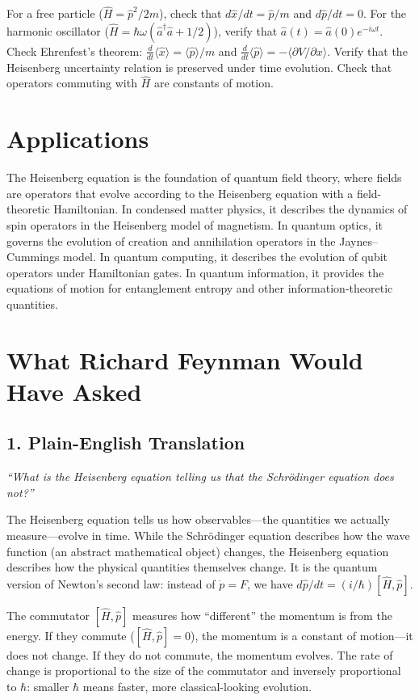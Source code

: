 \documentclass[11pt,openright]{book}
\begin{document}
For a free particle ($\hat{H} = \hat{p}^2/2m$), check that $d\hat{x}/dt = \hat{p}/m$ and $d\hat{p}/dt = 0$. For the harmonic oscillator ($\hat{H} = \hbar\omega(\hat{a}^\dagger\hat{a} + 1/2)$), verify that $\hat{a}(t) = \hat{a}(0)e^{-i\omega t}$. Check Ehrenfest's theorem: $\frac{d}{dt}\langle\hat{x}\rangle = \langle\hat{p}\rangle/m$ and $\frac{d}{dt}\langle\hat{p}\rangle = -\langle\partial V/\partial x\rangle$. Verify that the Heisenberg uncertainty relation is preserved under time evolution. Check that operators commuting with $\hat{H}$ are constants of motion.
\section*{Applications}

The Heisenberg equation is the foundation of quantum field theory, where fields are operators that evolve according to the Heisenberg equation with a field-theoretic Hamiltonian. In condensed matter physics, it describes the dynamics of spin operators in the Heisenberg model of magnetism. In quantum optics, it governs the evolution of creation and annihilation operators in the Jaynes--Cummings model. In quantum computing, it describes the evolution of qubit operators under Hamiltonian gates. In quantum information, it provides the equations of motion for entanglement entropy and other information-theoretic quantities.
\section*{What Richard Feynman Would Have Asked}

\subsection*{1. Plain-English Translation}
\textit{``What is the Heisenberg equation telling us that the Schr\"odinger equation does not?''}

The Heisenberg equation tells us how observables---the quantities we actually measure---evolve in time. While the Schr\"odinger equation describes how the wave function (an abstract mathematical object) changes, the Heisenberg equation describes how the physical quantities themselves change. It is the quantum version of Newton's second law: instead of $\dot{p} = F$, we have $d\hat{p}/dt = (i/\hbar)[\hat{H}, \hat{p}]$.

The commutator $[\hat{H}, \hat{p}]$ measures how ``different'' the momentum is from the energy. If they commute ($[\hat{H}, \hat{p}] = 0$), the momentum is a constant of motion---it does not change. If they do not commute, the momentum evolves. The rate of change is proportional to the size of the commutator and inversely proportional to $\hbar$: smaller $\hbar$ means faster, more classical-looking evolution.
\end{document}
